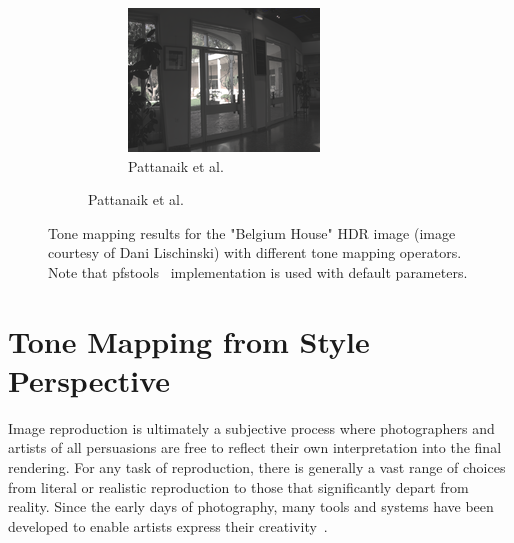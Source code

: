 \begin{figure}
\begin{subfigure}[t]{\textwidth}
\begin{subfigure}[t]{0.33\textwidth}
    \includegraphics[width=\textwidth]{figures/chapter2/tmos44/44_pattanaik00.png}
    \caption{Pattanaik et al.~\cite{pattanaik2000time}}
\end{subfigure}\hfill
\end{subfigure}
\caption{Tone mapping results for the "Belgium House" HDR image (image courtesy of Dani Lischinski) with different tone mapping operators. Note that pfstools~\cite{HDRGallery} implementation is used with default parameters.}
\label{fig:tmos}
\end{figure}

\section{Tone Mapping from Style Perspective}
Image reproduction is ultimately a subjective process where photographers and artists of all persuasions are free to reflect their own interpretation into the final rendering. For any task of reproduction, there is generally a vast range of choices from literal or realistic reproduction to those that significantly depart from reality. Since the early days of photography, many tools and systems have been developed to enable artists express their creativity~\cite{Adams80,Adams81,Adams83,White84}.

